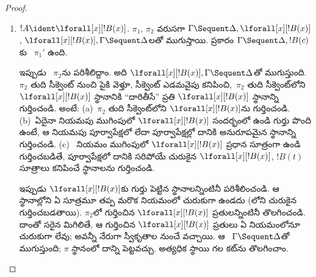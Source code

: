 \documentclass[../../../include/open-logic-section]{subfiles}
\begin{document}
\begin{proof}
\begin{enumerate}
  \[
  \AxiomC{}
  \RightLabel{$\pi_2'$}
  \Deduce$\Gamma \fCenter \Delta, !B$
  \AxiomC{}
  \RightLabel{$\pi_1'$}
  \Deduce$!B, \Gamma \fCenter \Delta, !C$
  \AxiomC{}
  \RightLabel{$\pi_2'''$}
  \Deduce$!C, !B, \Gamma \fCenter \Delta$
  \RightLabel{\CutCS}
  \BinaryInf$!B, \Gamma \fCenter \Delta$
  \RightLabel{\CutCS}
  \BinaryInf$\Gamma \fCenter \Delta$
  \DisplayProof
  \]
  \item $!A \ident \lforall[x][!B(x)]$.  $\pi_1$, $\pi_2$ వరుసగా $\Gamma \Sequent \Delta, \lforall[x][!B(x)]$, $\lforall[x][!B(x)], \Gamma \Sequent \Delta$లతో ముగుస్తాయి.  ప్రకారం $\Gamma
  \Sequent \Delta, !B(c)$కు ~$\pi_1'$ ఉంది.

  ఇప్పుడు ~$\pi_2$ను పరిశీలిద్దాం. అది $\lforall[x][!B(x)],
  \Gamma \Sequent \Delta$తో ముగుస్తుంది. $\pi_2$ తుది సీక్వెంట్ నుంచి పైకి వెళ్తూ, సీక్వెంట్ ఎడమవైపు కనిపించి,~$\pi_2$ తుది సీక్వెంట్‌లోని $\lforall[x][!B(x)]$ స్థానానికి ``దారితీసే'' ప్రతి $\lforall[x][!B(x)]$ స్థానాన్ని గుర్తించండి. అంటే: (a)~$\pi_2$ తుది సీక్వెంట్‌లోని $\lforall[x][!B(x)]$ను గుర్తించండి. (b)~ఏదైనా నియమపు ముగింపులో $\lforall[x][!B(x)]$ సందర్భంలో ఉండి గుర్తు పొంది ఉంటే, ఆ నియమపు పూర్వాపేక్షలో లేదా పూర్వాపేక్షల్లో దానికి అనురూపమైన స్థానాన్ని గుర్తించండి. (c)~\LeftR{\lforall} నియమం ముగింపులో $\lforall[x][!B(x)]$ ప్రధాన సూత్రంగా ఉండి గుర్తించబడితే, పూర్వాపేక్షలో దానికి సరిపోయే చురుకైన $\lforall[x][!B(x)]$, $!B(t)$ సూత్రాలు కనిపించే స్థానాలను గుర్తించండి.
  
  ఇప్పుడు $\lforall[x][!B(x)]$కు గుర్తు పెట్టిన స్థానాలన్నింటినీ పరిశీలించండి. ఆ స్థానాల్లోని ఏ సూత్రమూ \LeftR{\lforall} తప్ప మరొక నియమంలో చురుకుగా ఉండదు (\LeftR{\lforall}లోని చురుకైన  గుర్తించబడతాయి). $\pi_2$లో గుర్తించిన $\lforall[x][!B(x)]$ ప్రతులన్నింటినీ తొలగించండి. దాంతో సరైన  మిగిలితే, ఆ గుర్తించిన $\lforall[x][!B(x)]$ ప్రతులు ఏ నియమంలోనూ చురుకుగా లేవు; అవన్నీ నేరుగా స్వీకృతాల నుంచే వచ్చాయి. ఆ ~$\Gamma \Sequent \Delta$తో ముగుస్తుంది; $\pi$ స్థానంలో దాన్ని పెట్టవచ్చు. అత్యధిక స్థాయి గల కట్‌ను తొలగించాం.


\end{enumerate}
\end{proof}
\end{document}

